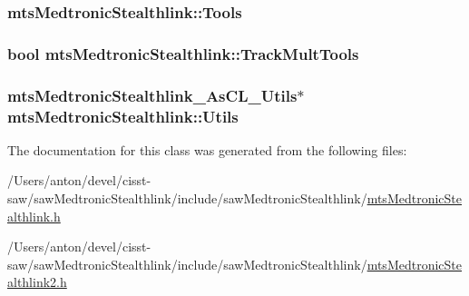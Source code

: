 \subsubsection[{Tools}]{ mts\+Medtronic\+Stealthlink\+::\+Tools\hspace{0.3cm}{\ttfamily [protected]}}\label{classmts_medtronic_stealthlink_acb4d5215e055c4c39c62d3a06259ccb4}
\hypertarget{classmts_medtronic_stealthlink_ac483f650c9ed1942194dbccca2c306d5}{}
\subsubsection[{Track\+Mult\+Tools}]{\setlength{\rightskip}{0pt plus 5cm}bool mts\+Medtronic\+Stealthlink\+::\+Track\+Mult\+Tools\hspace{0.3cm}{\ttfamily [protected]}}\label{classmts_medtronic_stealthlink_ac483f650c9ed1942194dbccca2c306d5}
\hypertarget{classmts_medtronic_stealthlink_ab6970edff3db4896a9cce824323f3c3e}{}
\subsubsection[{Utils}]{\setlength{\rightskip}{0pt plus 5cm}mts\+Medtronic\+Stealthlink\+\_\+\+As\+C\+L\+\_\+\+Utils$\ast$ mts\+Medtronic\+Stealthlink\+::\+Utils\hspace{0.3cm}{\ttfamily [protected]}}\label{classmts_medtronic_stealthlink_ab6970edff3db4896a9cce824323f3c3e}


The documentation for this class was generated from the following files\+:\begin{DoxyCompactItemize}
\item 
/\+Users/anton/devel/cisst-\/saw/saw\+Medtronic\+Stealthlink/include/saw\+Medtronic\+Stealthlink/\hyperlink{mts_medtronic_stealthlink_8h}{mts\+Medtronic\+Stealthlink.\+h}\item 
/\+Users/anton/devel/cisst-\/saw/saw\+Medtronic\+Stealthlink/include/saw\+Medtronic\+Stealthlink/\hyperlink{mts_medtronic_stealthlink2_8h}{mts\+Medtronic\+Stealthlink2.\+h}\end{DoxyCompactItemize}
